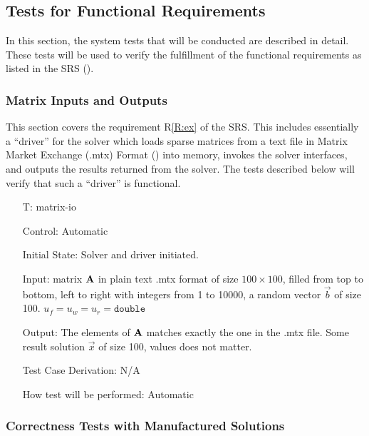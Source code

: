 \documentclass[12pt, titlepage]{article}
\newcounter{testnum} %
\newcommand{\rref}[1]{R\ref{#1}}
\begin{document}
\subsection{Tests for Functional Requirements}
\label{sec:tests-funct-requ}

In this section, the system tests that will be conducted are described in
detail. These tests will be used to verify the fulfillment of the functional
requirements as listed in the SRS (\cite{SRS}).

\subsubsection{Matrix Inputs and Outputs}

This section covers the requirement \rref{R:ex} of the SRS. This includes
essentially a ``driver'' for the solver which loads sparse matrices from a text
file in Matrix Market Exchange (.mtx) Format (\cite{noauthor_matrix_2013}) into memory,
invokes the solver interfaces, and outputs the results returned from the solver.
The tests described below will verify that such a ``driver'' is functional.

\begin{itemize}

\item[T\refstepcounter{testnum}\thetestnum \label{T:io}:]{matrix-io}

Control: Automatic

Initial State: Solver and driver initiated.

Input: matrix \(\mathbf{A}\) in plain text .mtx format of size \(\num{100} \times
\num{100}\), filled from top to bottom, left to right with integers from 1 to
\num{10000}, a random vector \(\vec{b}\) of size \num{100}. \(u_f = u_w = u_r =
\texttt{double}\)

Output: The elements of \(\mathbf{A}\) matches exactly the one in the .mtx file.
Some result solution \(\vec{x}\) of size \num{100}, values does not matter.

Test Case Derivation: N/A

How test will be performed: Automatic

\end{itemize}

\subsubsection{Correctness Tests with Manufactured Solutions}
\label{sec:corr-tests-with}
\end{document}
